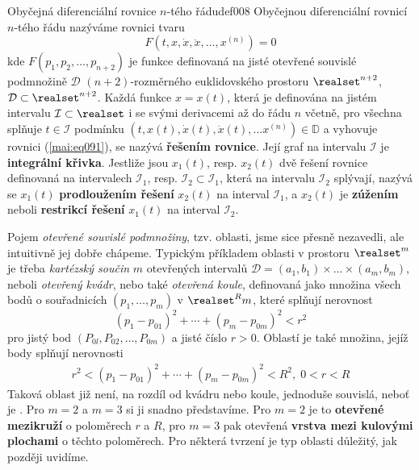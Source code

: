   \begin{mathdef}{Obyčejná diferenciální rovnice \(n\)-tého řádu}{def008}
    Obyčejnou diferenciální rovnicí \(n\)-tého řádu nazýváme rovnici tvaru 
    \begin{equation}\label{mai:eq091}
      F(t, x, \dot{x}, \ddot{x}, \ldots,x^{(n)}) = 0
    \end{equation}
    kde \(F(p_1, p_2, \ldots, p_{n+2})\) je funkce definovaná na jisté otevřené souvislé podmnožině
    \(\mathcal{D}\) \((n+2)\)-rozměrného euklidovského prostoru \(\realset^{n+2}\),
    \(\mathcal{D}\subset \realset^{n+2}\). Každá funkce \(x = x(t)\), která je definována na jistém
    intervalu \(\mathcal{I} \subset\realset\) i se svými derivacemi až do řádu \(n\) včetně, pro
    všechna  splňuje \(t\in\mathcal{I}\) podmínku \((t, x(t), \dot{x}(t), \ddot{x}(t), \ldots
    x^{(n)}) \in\mathbb{D}\) a vyhovuje rovnici (\ref{mai:eq091}), se nazývá \textbf{řešením
    rovnice}. Její graf na intervalu \(\mathcal{I}\) je \textbf{integrální křivka}. Jestliže jsou
    \(x_1(t)\), resp. \(x_2(t)\) dvě řešení rovnice definovaná na intervalech \(\mathcal{I}_1\),
    resp. \(\mathcal{I}_2 \subset \mathcal{I}_1\), která na intervalu \(\mathcal{I}_2\) splývají,
    nazývá se \(x_1(t)\) \textbf{prodloužením řešení} \(x_2(t)\) na interval \(\mathcal{I}_1\), a
    \(x_2(t)\) je \textbf{zúžením} neboli \textbf{restrikcí řešení} \(x_1(t)\) na interval
    \(\mathcal{I}_2\).
  \end{mathdef}
  
  \begin{mdframed}[style=mdnote]     
    Pojem \emph{otevřené souvislé podmnožiny}, tzv. oblasti, jsme sice přesně nezavedli, ale
    intuitivně jej dobře chápeme. Typickým příkladem oblasti v prostoru \(\realset^m\) je třeba
    \emph{kartézský součin} \(m\) otevřených intervalů \(\mathcal{D} = (a_1,b_1) \times\ldots\times
    (a_m, b_m)\), neboli \emph{otevřený kvádr}, nebo také \emph{otevřená koule}, definovaná jako
    množina všech bodů o souřadnicích \((p_1,\ldots, p_m)\) v \(\realset^Rm\), které splňují
    nerovnost 
    \begin{equation*}
      (p_1 - p_{01})^2 + \cdots + (p_m - p_{0m})^2 < r^2
    \end{equation*}
    pro jistý bod \((P_{0l}, P_{02}, \ldots, P_{0m})\) a jisté číslo \(r > 0\). Oblastí je také
    množina, jejíž body splňují nerovnosti
    \begin{gather*}
      r^2 < (p_1 - p_{01})^2 + \cdots + (p_m - p_{0m})^2 < R^2, \; 0 < r < R
    \end{gather*}
    Taková oblast již není, na rozdíl od kvádru nebo koule, jednoduše souvislá, neboť je
    . Pro \(m = 2\) a \(m = 3\) si ji snadno představíme. Pro \(m = 2\) je to
    \textbf{otevřené mezikruží} o poloměrech \(r\) a \(R\), pro \(m = 3\) pak otevřená
    \textbf{vrstva mezi kulovými plochami} o těchto poloměrech. Pro některá tvrzení je typ oblasti
    důležitý, jak později uvidíme. 
  \end{mdframed}

